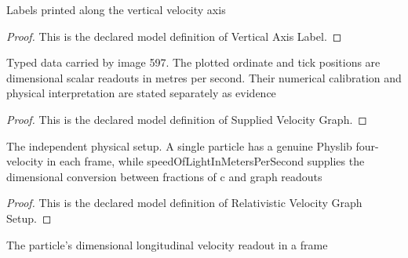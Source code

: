 \begin{definition}
  \label{def:physics:phyx-mini-0597:phyxminiproblems-problemphyxmini0597-verticalaxislabel}
  Labels printed along the vertical velocity axis
\end{definition}
\begin{proof}
  This is the declared model definition of Vertical Axis Label.
\end{proof}
\begin{definition}
  \label{def:physics:phyx-mini-0597:phyxminiproblems-problemphyxmini0597-suppliedvelocitygraph}
  Typed data carried by image 597. The plotted ordinate and tick positions are dimensional scalar readouts in metres per second. Their numerical calibration and physical interpretation are stated separately as evidence
\end{definition}
\begin{proof}
  This is the declared model definition of Supplied Velocity Graph.
\end{proof}
\begin{definition}
  \label{def:physics:phyx-mini-0597:phyxminiproblems-problemphyxmini0597-relativisticvelocitygraphsetup}
  The independent physical setup. A single particle has a genuine Physlib four-velocity in each frame, while speedOfLightInMetersPerSecond supplies the dimensional conversion between fractions of c and graph readouts
\end{definition}
\begin{proof}
  This is the declared model definition of Relativistic Velocity Graph Setup.
\end{proof}
\begin{definition}
  \label{def:physics:phyx-mini-0597:phyxminiproblems-problemphyxmini0597-particlelongitudinalvelocityinmeterspersecond}
  The particle's dimensional longitudinal velocity readout in a frame
\end{definition}
